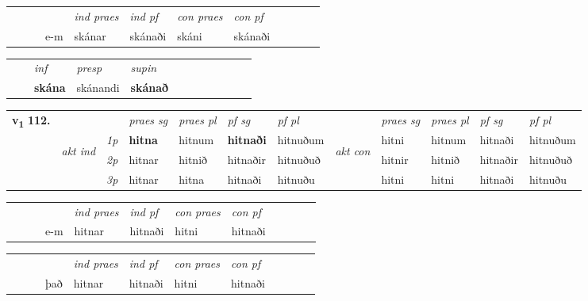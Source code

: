 \begin{tabular}{llllllllllll}
 & &  & &  \textit{ind praes} & \textit{ind pf} & \textit{con praes} & \textit{con pf} \\*
&  & & e-m & skánar & skánaði & skáni & skánaði \\*
\cmidrule{5-9}
\end{tabular}


\begin{tabular}{llllllllllll}
 & & \textit{inf}     & \textit{presp} & \textit{supin}       \\*
  & & \textbf{skána}      & skánandi &  \textbf{skánað}   \\*
\cmidrule{1-12}
\end{tabular}



\begin{tabular}{llllllllllll} \toprule
\multirow{4}{*}{{{\textbf{v{\textsubscript{1}}} \Large{\textbf{112.}}}}}  & &   &  \textit{praes sg}  & \textit{praes pl}  &\textit{ pf sg} & \textit{pf pl} &  &  \textit{praes sg}  & \textit{praes pl}  & \textit{pf sg} & \textit{pf pl } \\*
	\cmidrule{4-7} \cmidrule{9-12}
 & \multirow{3}{*}{\begin{turn}{90}\textit{akt ind}\end{turn}} & {\textit{1p}} & \textbf{hitna} & hitnum    & \textbf{hitnaði} & hitnuðum & \multirow{3}{*}{\begin{turn}{90}\textit{akt con}\end{turn}} &hitni & hitnum & hitnaði & hitnuðum\\*
& &  {\textit{2p}} &  hitnar  & hitnið   & hitnaðir & hitnuðuð & & hitnir & hitnið & hitnaðir & hitnuðuð \\*
& &  {\textit{3p}} & hitnar & hitna   & hitnaði & hitnuðu & & hitni & hitni& hitnaði & hitnuðu  \\*
\cmidrule{4-7} \cmidrule{9-12}
\end{tabular}


\begin{tabular}{llllllllllll}
 & &  & &  \textit{ind praes} & \textit{ind pf} & \textit{con praes} & \textit{con pf} \\*
&  & & e-m & hitnar & hitnaði & hitni & hitnaði \\*
\cmidrule{5-9}
\end{tabular}


\begin{tabular}{llllllllllll}
 & &  & &  \textit{ind praes} & \textit{ind pf} & \textit{con praes} & \textit{con pf} \\*
&  & & það & hitnar & hitnaði & hitni & hitnaði \\*
\cmidrule{5-9}
\end{tabular}


